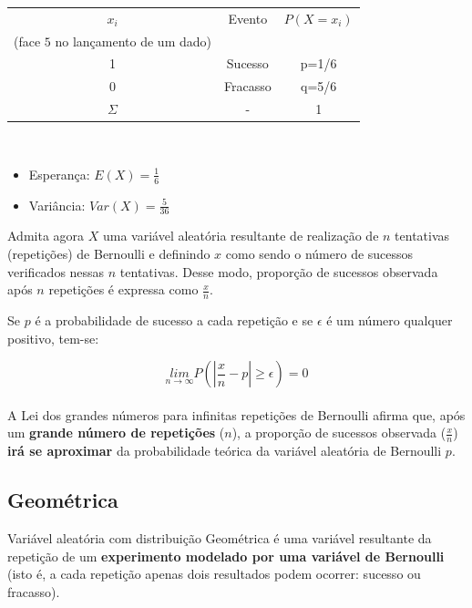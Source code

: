 \documentclass[
]{book}
\providecommand{\tightlist}{%
  \setlength{\itemsep}{0pt}\setlength{\parskip}{0pt}}
\begin{document}
\hfill\break

\begin{table}[h]
\centering
\begin{tabular}{|c|c|c|}
\hline 
$x_{i}$ & Evento & $P(X=x_{i})$ \\ 
(face $5$ no lançamento de um dado) &  &  \\ 
\hline 
1 & Sucesso & p=1/6 \\ 
\hline 
0 & Fracasso & q=5/6 \\ 
\hline 
$\Sigma$ & - & 1 \\ 
\hline 
\end{tabular} 
\end{table}

~

\begin{itemize}
\tightlist
\item
  Esperança: \(E(X)= \frac{1}{6}\)\\
\item
  Variância: \(Var(X)= \frac{5}{36}\)
\end{itemize}

\hfill\break

Admita agora \(X\) uma variável aleatória resultante de realização de \(n\) tentativas (repetições) de Bernoulli e definindo \(x\) como sendo o número de sucessos verificados nessas \(n\) tentativas. Desse modo, proporção de sucessos observada após \(n\) repetições é expressa como \(\frac{x}{n}\).

\hfill\break

Se \(p\) é a probabilidade de sucesso a cada repetição e se \(\epsilon\) é um número qualquer positivo, tem-se:

\hfill\break

\[
\underset{n\to \infty }{lim}P\left(\left|\frac{x}{n}-p\right|\ge \epsilon \right)=0
\]\\

A Lei dos grandes números para infinitas repetições de Bernoulli afirma que, após um \textbf{grande número de repetições} (\(n\)), a proporção de sucessos observada (\(\frac{x}{n}\)) \textbf{irá se aproximar} da probabilidade teórica da variável aleatória de Bernoulli \(p\).

\hypertarget{geomuxe9trica}{%
\subsection{Geométrica}\label{geomuxe9trica}}

Variável aleatória com distribuição Geométrica é uma variável resultante da repetição de um \textbf{experimento modelado por uma variável de Bernoulli} (isto é, a cada repetição apenas dois resultados podem ocorrer: sucesso ou fracasso).
\end{document}
